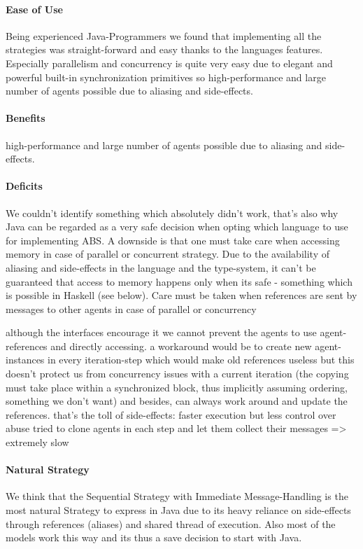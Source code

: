 \paragraph{Ease of Use}
Being experienced Java-Programmers we found that implementing all the strategies was straight-forward and easy thanks to the languages features. Especially parallelism and concurrency is quite very easy due to elegant and powerful built-in synchronization primitives so high-performance and large number of agents possible due to aliasing and side-effects.

\paragraph{Benefits}
high-performance and large number of agents possible due to aliasing and side-effects.

\paragraph{Deficits}
We couldn't identify something which absolutely didn't work, that's also why Java can be regarded as a very safe decision when opting which language to use for implementing ABS.
A downside is that one must take care when accessing memory in case of parallel or concurrent strategy. Due to the availability of aliasing and side-effects in the language and the type-system, it can't be guaranteed that access to memory happens only when its safe - something which is possible in Haskell (see below).
Care must be taken when references are sent by messages to other agents in case of parallel or concurrency

although the interfaces encourage it we cannot prevent the agents to use agent-references and directly accessing. a workaround would be to create new agent-instances in every iteration-step which would make old references useless but this doesn't protect us from concurrency issues with a current iteration (the copying must take place within a synchronized block, thus implicitly assuming ordering, something we don't want) and besides, can always work around and update the references.
that's the toll of side-effects: faster execution but less control over abuse
tried to clone agents in each step and let them collect their messages => extremely slow

\paragraph{Natural Strategy}
We think that the Sequential Strategy with Immediate Message-Handling is the most natural Strategy to express in Java due to its heavy reliance on side-effects through references (aliases) and shared thread of execution. Also most of the models work this way and its thus a save decision to start with Java.





